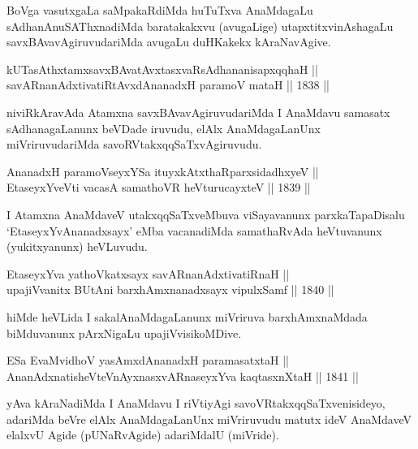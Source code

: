\begin{artha}
BoVga vasutxgaLa saMpakaRdiMda huTuTxva AnaMdagaLu
sAdhanAnuSAThxnadiMda baratakakxvu (avugaLige) utapxtitxvinAshagaLu
savxBAvavAgiruvudariMda avugaLu duHKakekx kAraNavAgive.
\end{artha}

\begin{shl}
kUTasAthxtamxsavxBAvatAvxtasxvaRsAdhananisapxqqhaH || \\
savARnanAdxtivatiRtAvxdAnanadxH paramoV mataH \hfill || 1838 ||  
\end{shl}

\begin{artha}
niviRkAravAda Atamxna savxBAvavAgiruvudariMda I AnaMdavu samasatx
sAdhanagaLanunx beVDade iruvudu, elAlx AnaMdagaLanUnx miVriruvudariMda
savoRVtakxqqSaTxvAgiruvudu.
\end{artha}


\begin{shl}
AnanadxH paramoV\s seyxYSa ituyxkAtxthaRparxsidadhxyeV || \\
EtaseyxYveVti vacasA samathoVR heVturucayxteV \hfill || 1839 ||  
\end{shl}

\begin{artha}
I Atamxna AnaMdaveV utakxqqSaTxveMbuva viSayavanunx parxkaTapaDisalu
`EtaseyxYvAnanadxsayx' eMba vacanadiMda samathaRvAda heVtuvanunx (yukitxyanunx)
heVLuvudu.
\end{artha}

\begin{shl}
EtaseyxYva yathoVkatxsayx savARnanAdxtivatiRnaH || \\
upajiVvanitx BUtAni barxhAmxnanadxsayx vipulxSamf \hfill || 1840 ||  
\end{shl}

\begin{artha}
hiMde heVLida I sakalAnaMdagaLanunx miVriruva barxhAmxnaMdada
biMduvanunx pArxNigaLu upajiVvisikoMDive.
\end{artha}

\begin{shl}
ESa EvaMvidhoV yasAmxdAnanadxH paramasatxtaH || \\
AnanAdxnatisheVteV\s nAyxnasxvARnaseyxYva kaqtasxnXtaH \hfill || 1841 ||  
\end{shl}

\begin{artha}
yAva kAraNadiMda I AnaMdavu I riVtiyAgi savoVRtakxqqSaTxvenisideyo,
adariMda beVre elAlx AnaMdagaLanUnx miVriruvudu matutx ideV AnaMdaveV
elalxvU Agide (pUNaRvAgide) adariMdalU (miVride).
\end{artha}

